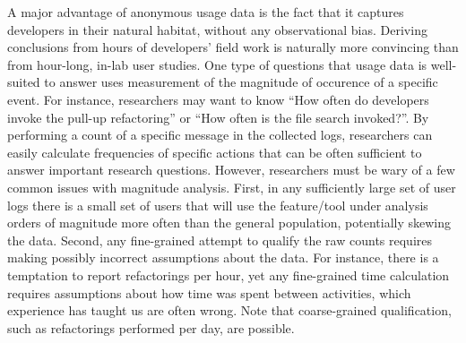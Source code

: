 

A major advantage of anonymous usage data is the fact that it captures developers in their natural habitat, without any observational bias. Deriving conclusions from hours of developers' field work is naturally more convincing than from hour-long, in-lab user studies. One type of questions that usage data is well-suited to answer uses measurement of the magnitude of occurence of a specific event. For instance, researchers may want to know ``How often do developers invoke the pull-up refactoring'' or ``How often is the file search invoked?''. By performing a count of a specific message in the collected logs, researchers can easily calculate frequencies of specific actions that can be often sufficient to answer important research questions. However, researchers must be wary of a few common issues with magnitude analysis. First, in any sufficiently large set of user logs there is a small set of users that will use the feature/tool under analysis orders of magnitude more often than the general population, potentially skewing the data. Second, any fine-grained attempt to qualify the raw counts requires making possibly incorrect assumptions about the data. For instance, there is a temptation to report refactorings per hour, yet any fine-grained time calculation requires assumptions about how time was spent between activities, which experience has taught us are often wrong. Note that coarse-grained qualification, such as refactorings performed per day, are possible.   
